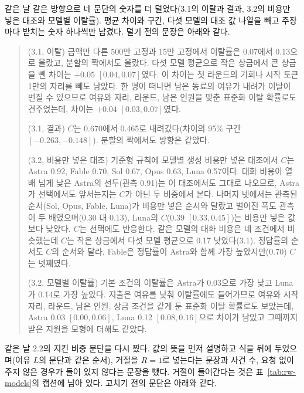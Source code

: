 같은 날 같은 방향으로 네 문단의 숫자를 더 덜었다(3.1의 이탈과 결과, 3.2의 비용만 넣은 대조와 모델별 이탈률). 평균 차이와 구간, 다섯 모델의 대조 값 나열을 빼고 주장마다 받치는 숫자 하나씩만 남겼다. 덜기 전의 문장은 아래와 같다.

\begin{quote}\small
{\color{black}
(3.1, 이탈) 금액만 다른 500만 고정과 15만 고정에서 이탈률은 0.07에서 0.13으로 올랐고, 분할의 짝에서도 올랐다. 다섯 모델 평균으로 작은 상금에서 큰 상금을 뺀 차이는 $+0.05$ $[0.04,0.07]$였다. 이 차이는 첫 라운드의 기회나 시작 토큰 1만의 자리를 빼도 남았다. 한 명이 떠나면 남은 동료의 여유가 내려가 이탈이 번질 수 있으므로 여유와 자리, 라운드, 남은 인원을 맞춘 표준화 이탈 확률로도 견주었는데, 차이는 $+0.04$ $[0.03,0.07]$였다.

(3.1, 결과) $C$는 0.670에서 0.465로 내려갔다(차이의 95\% 구간 $[-0.263,-0.148]$). 분할의 짝에서도 방향은 같았다.

(3.2, 비용만 넣은 대조) 기준형 규칙에 모델별 생성 비용만 넣은 대조에서 $C$는 Astra 0.92, Fable 0.70, Sol 0.67, Opus 0.63, Luna 0.57이다. 대화 비용이 열 배 넘게 낮은 Astra의 선두(관측 0.91)는 이 대조에서도 그대로 나오므로, Astra가 선택에서도 앞서는지는 $C$가 아닌 두 비중에서 본다. 나머지 넷에서는 관측된 순서(Sol, Opus, Fable, Luna)가 비용만 넣은 순서와 달랐고 벌어진 폭도 관측이 두 배였으며(0.30 대 0.13), Luna의 $C$(0.39 $[0.33,0.45]$)는 비용만 넣은 값보다 낮았다. $C$는 선택에도 반응한다. 같은 모델의 대화 비용은 네 조건에서 비슷했는데 $C$는 작은 상금에서 다섯 모델 평균으로 0.17 낮았다(3.1). 정답률의 순서도 $C$의 순서와 달라, Fable은 정답률이 Astra와 함께 가장 높았지만(0.70) $C$는 넷째였다.

(3.2, 모델별 이탈률) 기본 조건의 이탈률은 Astra가 0.03으로 가장 낮고 Luna가 0.14로 가장 높았다. 지출은 여유를 낮춰 이탈률에도 들어가므로 여유와 시작 자리, 라운드, 남은 인원, 상금 조건을 같게 둔 표준화 이탈 확률로도 보았는데, Astra 0.03 $[0.00,0.06]$, Luna 0.12 $[0.08,0.16]$으로 차이가 남았고 그때까지 받은 지원을 모형에 더해도 같았다.
}
\end{quote}

같은 날 2.2의 지킨 비중 문단을 다시 짰다. 값의 뜻을 먼저 설명하고 식을 뒤에 두었으며(여유 $L$의 문단과 같은 순서), 거절을 $R=1$로 넣는다는 문장과 사건 수, 요청 없이 주지 않은 경우가 들어 있지 않다는 문장을 뺐다. 거절이 들어간다는 것은 표~\ref{tab:rw-models}의 캡션에 남아 있다. 고치기 전의 문단은 아래와 같다.

